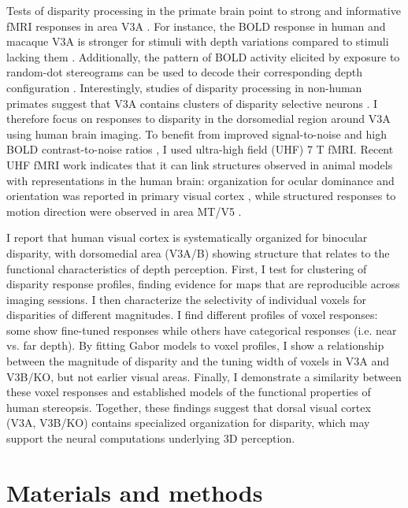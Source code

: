Tests of disparity processing in the primate brain point to strong and informative fMRI responses in area V3A \cite{Backus:2001ly,Tsao:2003lk,Preston:2008dg,Ban:2015cr}. For instance, the BOLD response in human and macaque V3A is stronger for stimuli with depth variations compared to stimuli lacking them \cite{Tsao:2003lk}. Additionally, the pattern of BOLD activity elicited by exposure to random-dot stereograms can be used to decode their corresponding depth configuration \cite{Preston:2008dg}. Interestingly, studies of disparity processing in non-human primates suggest that V3A contains clusters of disparity selective neurons \cite{Adams:2001wt,Anzai:2011gb,Yeagle_Lafer-Sousa_Conway_2013}. I therefore focus on responses to disparity in the dorsomedial region around V3A using human brain imaging. To benefit from improved signal-to-noise and high BOLD contrast-to-noise ratios \cite{Zwaag:2009ss}, I used ultra-high field (UHF) 7 T fMRI. Recent UHF fMRI work indicates that it can link structures observed in animal models with representations in the human brain: organization for ocular dominance and orientation was reported in primary visual cortex \cite{Cheng:2001fk,Yacoub:2008hr}, while structured responses to motion direction were observed in area MT/V5 \cite{Zimmermann:2011kl}. 

I report that human visual cortex is systematically organized for binocular disparity, with dorsomedial area (V3A/B) showing structure that relates to the functional characteristics of depth perception. First, I test for clustering of disparity response profiles, finding evidence for maps that are reproducible across imaging sessions. I then characterize the selectivity of individual voxels for disparities of different magnitudes. I find different profiles of voxel responses: some show fine-tuned responses while others have categorical responses (i.e. near vs. far depth). By fitting Gabor models to voxel profiles, I show a relationship between the magnitude of disparity and the tuning width of voxels in V3A and V3B/KO, but not earlier visual areas. Finally, I demonstrate a similarity between these voxel responses and established models of the functional properties of human stereopsis. Together, these findings suggest that dorsal visual cortex (V3A, V3B/KO) contains specialized organization for disparity, which may support the neural computations underlying 3D perception.


\section{Materials and methods}

